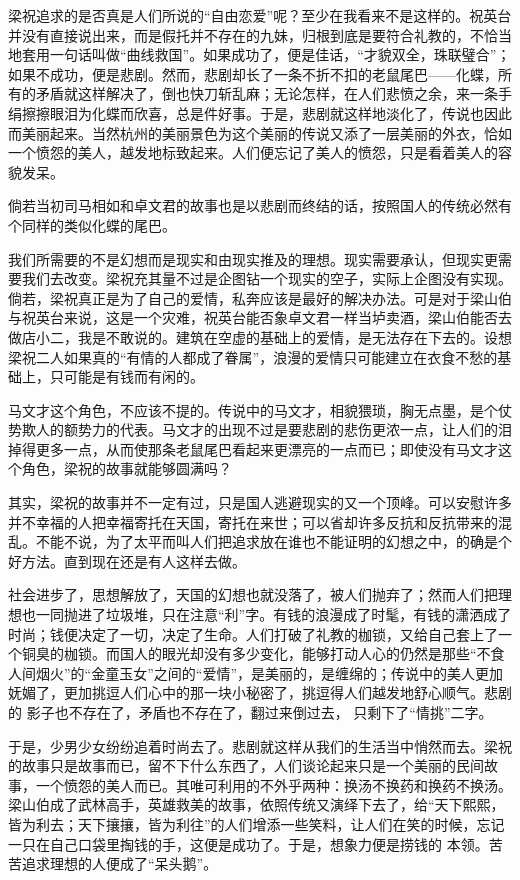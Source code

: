 梁祝追求的是否真是人们所说的“自由恋爱”呢？至少在我看来不是这样的。祝英台并没有直接说出来，而是假托并不存在的九妹，归根到底是要符合礼教的，不恰当地套用一句话叫做“曲线救国”。如果成功了，便是佳话，“才貌双全，珠联璧合”；如果不成功，便是悲剧。然而，悲剧却长了一条不折不扣的老鼠尾巴——化蝶，所有的矛盾就这样解决了，倒也快刀斩乱麻；无论怎样，在人们悲愤之余，来一条手绢擦擦眼泪为化蝶而欣喜，总是件好事。于是，悲剧就这样地淡化了，传说也因此而美丽起来。当然杭州的美丽景色为这个美丽的传说又添了一层美丽的外衣，恰如一个愤怨的美人，越发地标致起来。人们便忘记了美人的愤怨，只是看着美人的容貌发呆。
	
倘若当初司马相如和卓文君的故事也是以悲剧而终结的话，按照国人的传统必然有个同样的类似化蝶的尾巴。
	
我们所需要的不是幻想而是现实和由现实推及的理想。现实需要承认，但现实更需要我们去改变。梁祝充其量不过是企图钻一个现实的空子，实际上企图没有实现。倘若，梁祝真正是为了自己的爱情，私奔应该是最好的解决办法。可是对于梁山伯与祝英台来说，这是一个灾难，祝英台能否象卓文君一样当垆卖酒，梁山伯能否去做店小二，我是不敢说的。建筑在空虚的基础上的爱情，是无法存在下去的。设想梁祝二人如果真的“有情的人都成了眷属”，浪漫的爱情只可能建立在衣食不愁的基础上，只可能是有钱而有闲的。
	
马文才这个角色，不应该不提的。传说中的马文才，相貌猥琐，胸无点墨，是个仗势欺人的额势力的代表。马文才的出现不过是要悲剧的悲伤更浓一点，让人们的泪掉得更多一点，从而使那条老鼠尾巴看起来更漂亮的一点而已；即使没有马文才这个角色，梁祝的故事就能够圆满吗？
	
其实，梁祝的故事并不一定有过，只是国人逃避现实的又一个顶峰。可以安慰许多并不幸福的人把幸福寄托在天国，寄托在来世；可以省却许多反抗和反抗带来的混乱。不能不说，为了太平而叫人们把追求放在谁也不能证明的幻想之中，的确是个好方法。直到现在还是有人这样去做。
	
社会进步了，思想解放了，天国的幻想也就没落了，被人们抛弃了；然而人们把理想也一同抛进了垃圾堆，只在注意“利”字。有钱的浪漫成了时髦，有钱的潇洒成了时尚；钱便决定了一切，决定了生命。人们打破了礼教的枷锁，又给自己套上了一个铜臭的枷锁。而国人的眼光却没有多少变化，能够打动人心的仍然是那些“不食人间烟火”的“金童玉女”之间的“爱情”，是美丽的，是缠绵的；传说中的美人更加妩媚了，更加挑逗人们心中的那一块小秘密了，挑逗得人们越发地舒心顺气。悲剧的 影子也不存在了，矛盾也不存在了，翻过来倒过去， 只剩下了“情挑”二字。
	
于是，少男少女纷纷追着时尚去了。悲剧就这样从我们的生活当中悄然而去。梁祝的故事只是故事而已，留不下什么东西了，人们谈论起来只是一个美丽的民间故事，一个愤怨的美人而已。其唯可利用的不外乎两种：换汤不换药和换药不换汤。梁山伯成了武林高手，英雄救美的故事，依照传统又演绎下去了，给“天下熙熙，皆为利去；天下攘攘，皆为利往”的人们增添一些笑料，让人们在笑的时候，忘记一只在自己口袋里掏钱的手，这便是成功了。于是，想象力便是捞钱的 本领。苦苦追求理想的人便成了“呆头鹅”。
	
